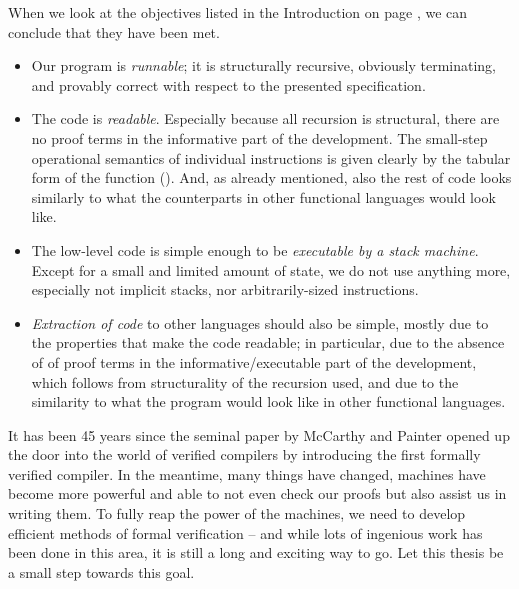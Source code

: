 When we look at the objectives listed in the Introduction on page \pageref{objectives},
we can conclude that they have been met.
\begin{itemize}
	\item Our program is \emph{runnable}; it is structurally recursive,
		obviously terminating, and provably correct with respect to the presented
		specification.
		
	\item The code is \emph{readable}. Especially because all recursion is structural,
		there are no proof terms in the
		informative part of the development. The small-step operational semantics
		of individual instructions is given clearly by the tabular form of the function
		 (). And, as already mentioned,
		also the rest of code looks similarly to what the counterparts in other functional
		languages would look like.
		
	\item The low-level code is simple enough to be \emph{executable by a stack machine}.
		Except for a small and limited amount of state, we do not use anything more,
		especially not implicit stacks, nor arbitrarily-sized instructions.
		
	\item \emph{Extraction of code} to other languages should also be simple, mostly due to
		the properties that make the code readable; in particular, due to the absence of
		of proof terms in the informative/executable part of the development, which follows
		from structurality of the recursion used, and due to the similarity to what
		the program would look like in other functional languages.
\end{itemize}

It has been 45 years since the seminal paper by McCarthy and Painter \cite{mccarthy67}
opened up the door into the world of verified compilers by introducing the first formally
verified compiler. In the meantime, many things have changed,
machines have become more powerful and able to not even check our proofs but also assist us
in writing them. To fully reap the power of the machines, we need to develop
efficient methods of formal verification -- and while lots of ingenious work has been
done in this area, it is still a long and exciting way to go. Let this thesis be a small
step towards this goal.

